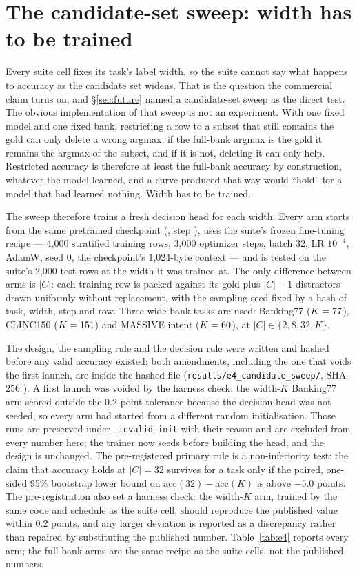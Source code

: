 \section{The candidate-set sweep: width has to be trained}
\label{sec:candidates}

Every suite cell fixes its task's label width, so the suite cannot say what
happens to accuracy as the candidate set widens. That is the question the
commercial claim turns on, and \S\ref{sec:future} named a candidate-set sweep as
the direct test. The obvious implementation of that sweep is not an experiment.
With one fixed model and one fixed bank, restricting a row to a subset that still
contains the gold can only delete a wrong argmax: if the full-bank argmax is the
gold it remains the argmax of the subset, and if it is not, deleting it can only
help. Restricted accuracy is therefore at least the full-bank accuracy by
construction, whatever the model learned, and a curve produced that way would
``hold'' for a model that had learned nothing. Width has to be trained.

The sweep therefore trains a fresh decision head for each width. Every arm starts
from the same pretrained checkpoint (\SuiteCkptLarge, step \SuiteCkptLargeStep),
uses the suite's frozen fine-tuning recipe --- 4{,}000 stratified training rows,
3{,}000 optimizer steps, batch 32, LR \(10^{-4}\), AdamW, seed 0, the
checkpoint's 1{,}024-byte context --- and is tested on the suite's 2{,}000 test
rows at the width it was trained at. The only difference between arms is
\(|C|\): each training row is packed against its gold plus \(|C|-1\) distractors
drawn uniformly without replacement, with the sampling seed fixed by a hash of
task, width, step and row. Three wide-bank tasks are used: Banking77
(\(K=77\)), CLINC150 (\(K=151\)) and MASSIVE intent
(\(K=60\)), at \(|C| \in \{2, 8, 32, K\}\).

The design, the sampling rule and the decision rule were written and hashed
before any valid accuracy existed; both amendments, including the one that voids
the first launch, are inside the hashed file (\texttt{results/e4\_candidate\_sweep/}, SHA-256
\EPreregSha). A first launch was voided by the harness check: the width-\(K\)
Banking77 arm scored outside the 0.2-point tolerance because the decision head
was not seeded, so every arm had started from a different random
initialisation. Those runs are preserved under \texttt{\_invalid\_init} with
their reason and are excluded from every number here; the trainer now seeds
before building the head, and the design is unchanged. The pre-registered primary rule is a non-inferiority test: the
claim that accuracy holds at \(|C|=32\) survives for a task only if the paired,
one-sided 95\% bootstrap lower bound on
\(\mathrm{acc}(32)-\mathrm{acc}(K)\) is above \(-5.0\) points. The pre-registration also set a harness check: the
width-\(K\) arm, trained by the same code and schedule as the suite cell, should
reproduce the published value within 0.2 points, and any larger deviation is
reported as a discrepancy rather than repaired by substituting the published
number. Table~\ref{tab:e4} reports every arm; the full-bank arms are the same
recipe as the suite cells, not the published numbers.

